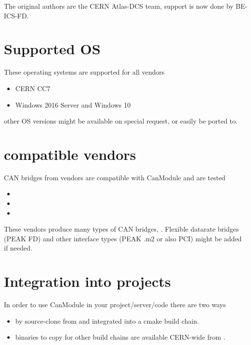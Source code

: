 \documentclass[letterpaper,10pt,english]{sphinxmanual}
\begin{document}
The original authors are the CERN Atlas-DCS team, support is now done by BE-ICS-FD.


\section{Supported OS}
\label{\detokenize{objective:supported-os}}
These operating systems are supported for all vendors
\begin{itemize}
\item {} 
CERN CC7

\item {} 
Windows 2016 Server and Windows 10

\end{itemize}

other OS versions might be available on special request, or easily be ported to.


\section{compatible vendors}
\label{\detokenize{objective:compatible-vendors}}
CAN bridges from vendors are compatible with CanModule and are tested
\begin{itemize}
\item {} 

\item {} 

\item {} 

\end{itemize}

These vendors produce many types of CAN bridges, . Flexible datarate bridges (PEAK FD) and other interface types
(PEAK .m2 or also PCI) might be added if needed.


\section{Integration into projects}
\label{\detokenize{objective:integration-into-projects}}
In order to use CanModule in your  project/server/code there are two ways
\begin{itemize}
\item {} 
by source-clone from  and integrated into a cmake build chain.

\item {} 
binaries to copy for other build chains are available CERN-wide from  .

\end{itemize}
\end{document}
